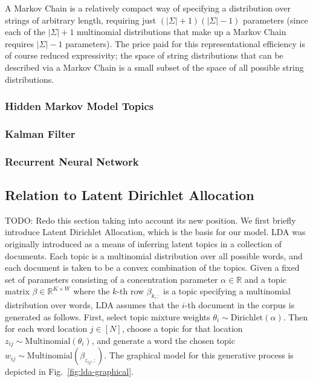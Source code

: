 \documentclass[letterpaper]{article}
\newcommand{\fg}{Fig.}
\begin{document}
A Markov Chain is a relatively compact way of specifying a distribution over strings of arbitrary length, requiring just $(|\Sigma| + 1)(|\Sigma| - 1)$ parameters (since each of the $|\Sigma| + 1$ multinomial distributions that make up a Markov Chain requires $|\Sigma| - 1$ parameters). The price paid for this representational efficiency is of course reduced expressivity; the space of string distributions that can be described via a Markov Chain is a small subset of the space of all possible string distributions.

\subsubsection{Hidden Markov Model Topics}

\subsubsection{Kalman Filter}

\subsubsection{Recurrent Neural Network}

\subsection{Relation to Latent Dirichlet Allocation}
TODO: Redo this section taking into account its new position.
We first briefly introduce Latent Dirichlet Allocation, which is the basis for our model. LDA was originally introduced as a means of inferring latent topics in a collection of documents. Each topic is a multinomial distribution over all possible words, and each document is taken to be a convex combination of the topics. Given a fixed set of parameters consisting of a concentration parameter $\alpha \in \mathbb{R}$ and a topic matrix $\beta \in \mathbb{R}^{K\times W}$ where the $k$-th row $\beta_{k, :}$ is a topic specifying a multinomial distribution over words, LDA assumes that the $i$-th document in the corpus is generated as follows. First, select topic mixture weights $\theta_i \sim \text{Dirichlet}(\alpha)$. Then for each word location $j \in [N]$, choose a topic for that location $z_{ij} \sim \text{Multinomial}(\theta_i)$, and generate a word the chosen topic $w_{ij} \sim \text{Multinomial}(\beta_{z_{ij}, :})$. The graphical model for this generative process is depicted in \fg~\ref{fig:lda-graphical}.
\end{document}
